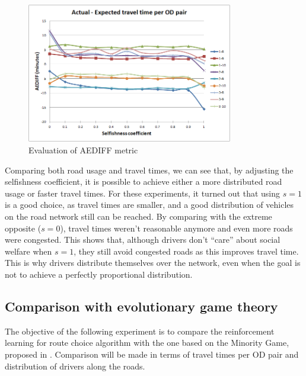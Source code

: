 \documentclass[12pt]{article}
\begin{document}
\begin{figure}[ht]
    \centerline{\includegraphics[width=9cm]{img/travelTimePerOD.png}}
    \caption{Evaluation of AEDIFF metric}
    \label{fig:travelTimePerOD}
\end{figure}

Comparing both road usage and travel times, we can see that, by adjusting the selfishness coefficient, it is possible to achieve either a more distributed road usage or faster travel times. For these experiments, it turned out that using $s=1$ is a good choice, as travel times are smaller, and a good distribution of vehicles on the road network still can be reached. By comparing with the extreme opposite ($s = 0$), travel times weren't reasonable anymore and even more roads were congested. This shows that, although drivers don't ``care'' about social welfare when $s=1$, they still avoid congested roads as this improves travel time. This is why drivers distribute themselves over the network, even when the goal is not to achieve a perfectly proportional distribution.

\subsection{Comparison with evolutionary game theory}

The objective of the following experiment is to compare the reinforcement learning for route choice algorithm with the one based on the Minority Game, proposed in \cite{Galib&Moser2011}. Comparison will be made in terms of travel times per OD pair and distribution of drivers along the roads. 
\end{document}
